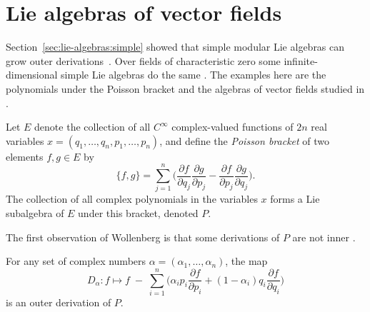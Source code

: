 \section{Lie algebras of vector fields}\label{sec:lie-algebras:vector-fields}

Section~\ref{sec:lie-algebras:simple} showed that simple modular Lie algebras
can grow outer derivations~\cite{Wollenberg1969,IkedaKawamoto1990,Li2019,RandriambololondrantomalalaAsif2022}. Over fields of characteristic zero some
infinite-dimensional simple Lie algebras do the same
\cite{Wollenberg1969,IkedaKawamoto1990,Li2019}. The examples here are the
polynomials under the Poisson bracket and the algebras of vector fields
studied in
\cite{Wollenberg1969,IkedaKawamoto1990,Li2019,RandriambololondrantomalalaAsif2022}.

\begin{definition}\label{def:lie:poisson-bracket}
Let $E$ denote the collection of all $C^{\infty}$ complex-valued functions
of $2n$ real variables $x=(q_{1},\dots,q_{n},p_{1},\dots,p_{n})$, and
define the \emph{Poisson bracket} of two elements $f,g\in E$ by
\[
\{f,g\}=\sum_{j=1}^{n}\Big(\frac{\partial f}{\partial q_{j}}\frac{\partial g}{\partial p_{j}}-\frac{\partial f}{\partial p_{j}}\frac{\partial g}{\partial q_{j}}\Big).
\]
The collection of all complex polynomials in the variables $x$ forms a Lie
subalgebra of $E$ under this bracket, denoted $P$.
\end{definition}

The first observation of Wollenberg is that some derivations of $P$ are
not inner \cite[Lemma~1, p.~316]{Wollenberg1969}.

\begin{lemma}\label{lem:lie:wollenberg-outer}
For any set of complex numbers $\alpha=(\alpha_{1},\dots,\alpha_{n})$, the
map
\[
D_{\alpha}\colon f\longmapsto f\;-\;\sum_{i=1}^{n}\Big(\alpha_{i}p_{i}\frac{\partial f}{\partial p_{i}}+(1-\alpha_{i})q_{i}\frac{\partial f}{\partial q_{i}}\Big)
\]
is an outer derivation of $P$.
\end{lemma}

